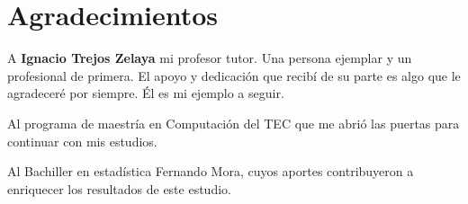 \section*{Agradecimientos}
A \textbf{Ignacio Trejos Zelaya} mi profesor tutor. Una persona ejemplar y un profesional de primera. El apoyo y dedicación que recibí de su parte es algo que le agradeceré por siempre. Él es mi ejemplo a seguir.


Al programa de maestría en Computación del TEC que me abrió las puertas para continuar con mis estudios.

Al Bachiller en estadística Fernando Mora, cuyos aportes contribuyeron a enriquecer los resultados de este estudio.


\newpage